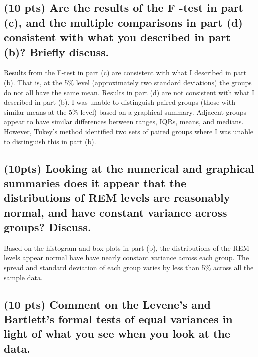 \documentclass{article}\usepackage[]{graphicx}\usepackage[]{color}
\begin{document}
\subsection{(10 pts) Are the results of the F -test in part (c), and the multiple comparisons in part (d) consistent with what you described in part (b)? Briefly discuss.}
Results from the F-test in part (c) are consistent with what I described in part (b).  That is, at the 5\% level (approximately two standard deviations) the groups do not all have the same mean.  Results in part (d) are not consistent with what I described in part (b).  I was unable to distinguish paired groups (those with similar means at the 5\% level) based on a graphical summary.  Adjacent groups appear to have similar differences between ranges, IQRs, means, and medians.  However, Tukey's method identified two sets of paired groups where I was unable to distinguish this in part (b).

\subsection{(10pts) Looking at the numerical and graphical summaries does it appear that the distributions of REM levels are reasonably normal, and have constant variance across groups? Discuss.}
Based on the histogram and box plots in part (b), the distributions of the REM levels appear normal have have nearly constant variance across each group.  The spread and standard deviation of each group varies by less than 5\% across all the sample data.

\subsection{(10 pts) Comment on the Levene’s and Bartlett’s formal tests of equal variances in light of what you see when you look at the data.}
\end{document}
